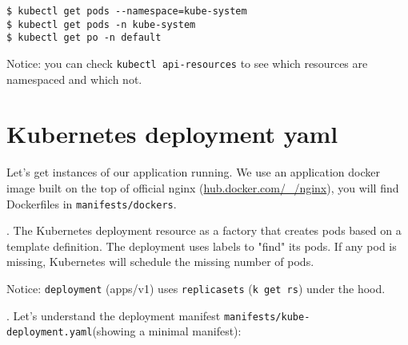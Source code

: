 \documentclass[12pt, letterpaper]{article}
\begin{document}
\begin{verbatim}
$ kubectl get pods --namespace=kube-system
$ kubectl get pods -n kube-system
$ kubectl get po -n default
\end{verbatim}

Notice: you can check \verb|kubectl api-resources| to see which resources are namespaced and which not.

%
%
\pagebreak
\section{Kubernetes deployment yaml}

Let's get instances of our application running. We use an application docker image built on the top of official nginx (\href{https://hub.docker.com/\_/nginx}{hub.docker.com/\_/nginx}), you will find Dockerfiles in \texttt{manifests/dockers}.

. The Kubernetes deployment resource as a factory that creates pods based on a template definition. The deployment uses labels to "find" its pods. If any pod is missing, Kubernetes will schedule the missing number of pods.

\begin{figure}[ht]
\centering
{}
\end{figure}

Notice: \verb|deployment| (apps/v1) uses \verb|replicasets| (\verb|k get rs|) under the hood.

. Let's understand the deployment manifest \texttt{manifests/kube-deployment.yaml}(showing a minimal manifest):
\end{document}
